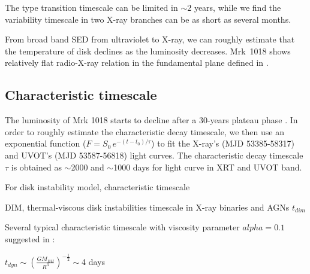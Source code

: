 \documentclass[twocolumn]{aastex63}
\begin{document}
The type transition timescale can be limited in $\sim 2$ years, while we find the variability timescale in two X-ray branches can be as short as several months. 

From broad band SED from ultraviolet to X-ray, we can roughly estimate that the temperature of disk declines as the luminosity decreases.
Mrk~1018 shows relatively flat radio-X-ray relation in the fundamental plane defined in \citet{2012MNRAS.419..267P}.

\subsection{Characteristic timescale}
The luminosity of Mrk 1018 starts to decline after a 30-years plateau phase \citep[see][]{2016A&A...593L...8M}. In order to roughly estimate the characteristic decay timescale, we then use an exponential function ($F=S_0\,e^{-(t-t_0)/\tau }$) to fit the X-ray's (MJD 53385-58317) and UVOT's (MJD 53587-56818) light curves. The characteristic decay timescale $\tau$ is obtained as $\sim$2000 and $\sim$1000 days for light curve in XRT and UVOT band. 

For disk instability model, characteristic timescale  

DIM, thermal-viscous disk instabilities timescale in X-ray binaries and AGNs
\citep[e.g.,][for details and reviews)]{2001NewAR..45..449L,2009A&A...496..413H,2019arXiv191001852H}
$t_{dim} $



Several typical characteristic timescale with viscosity parameter $alpha=0.1$ suggested in \citet{2018MNRAS.480.3898N}:

$t_{dyn}\sim (\frac{GM_{BH}}{R^3})^{-\frac{1}{2}} \sim $4 days
\end{document}
